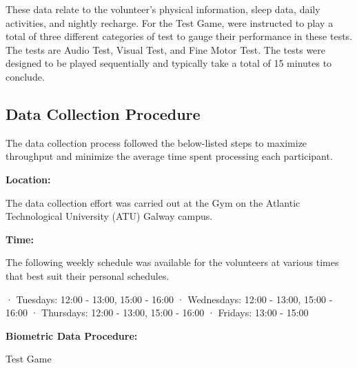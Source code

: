 These data relate 
to the volunteer’s physical information, sleep data, daily activities, and nightly recharge.
For the Test Game, were instructed to play a total of three different categories of test to gauge their performance in these tests. The tests are Audio Test, Visual Test, and Fine Motor
Test. The tests were designed to be played sequentially and typically take a total of 15 minutes to conclude.

\subsection{Data Collection Procedure}

The data collection process followed the below-listed steps to maximize throughput and minimize the average time spent processing each participant.

\textbf{Location:}

The data collection effort was carried out at the Gym on the Atlantic Technological University (ATU) Galway campus.

\textbf{Time:}

The following weekly schedule was available for the volunteers at various times that best suit their personal schedules.

· Tuesdays: 12:00 - 13:00, 15:00 - 16:00
· Wednesdays: 12:00 - 13:00, 15:00 - 16:00
· Thursdays: 12:00 - 13:00, 15:00 - 16:00
· Fridays: 13:00 - 15:00

\textbf{Biometric Data Procedure:}


Test Game